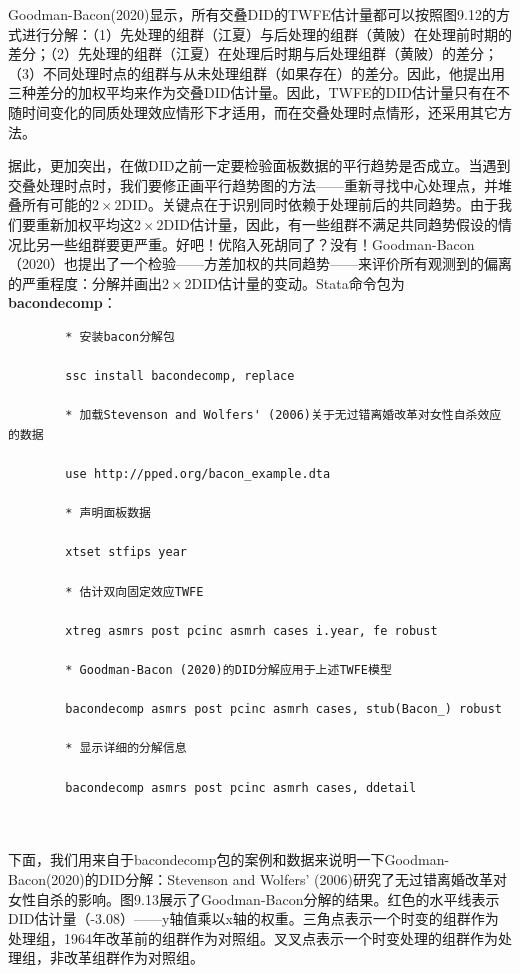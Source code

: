 \documentclass[cn,12pt,math=newtx,citestyle=gb7714-2015,bibstyle=gb7714-2015]{elegantbook}
\begin{document}
	Goodman-Bacon(2020)显示，所有交叠DID的TWFE估计量都可以按照图9.12的方式进行分解：（1）先处理的组群（江夏）与后处理的组群（黄陂）在处理前时期的差分；（2）先处理的组群（江夏）在处理后时期与后处理组群（黄陂）的差分；（3）不同处理时点的组群与从未处理组群（如果存在）的差分。因此，他提出用三种差分的加权平均来作为交叠DID估计量。因此，TWFE的DID估计量只有在不随时间变化的同质处理效应情形下才适用，而在交叠处理时点情形，还采用其它方法。
	
	据此，更加突出，在做DID之前一定要检验面板数据的平行趋势是否成立。当遇到交叠处理时点时，我们要修正画平行趋势图的方法——重新寻找中心处理点，并堆叠所有可能的$2 \times 2$DID。关键点在于识别同时依赖于处理前后的共同趋势。由于我们要重新加权平均这$2 \times 2$DID估计量，因此，有一些组群不满足共同趋势假设的情况比另一些组群要更严重。好吧！优陷入死胡同了？没有！Goodman-Bacon（2020）也提出了一个检验——方差加权的共同趋势——来评价所有观测到的偏离的严重程度：分解并画出$2 \times 2$DID估计量的变动。Stata命令包为\textbf{bacondecomp}：
	
	\begin{lstlisting}
		* 安装bacon分解包
		
		ssc install bacondecomp, replace
		
		* 加载Stevenson and Wolfers' (2006)关于无过错离婚改革对女性自杀效应的数据
		
		use http://pped.org/bacon_example.dta
		
		* 声明面板数据
		
		xtset stfips year
		
		* 估计双向固定效应TWFE
		
		xtreg asmrs post pcinc asmrh cases i.year, fe robust
		
		* Goodman-Bacon (2020)的DID分解应用于上述TWFE模型
		
		bacondecomp asmrs post pcinc asmrh cases, stub(Bacon_) robust
		
		* 显示详细的分解信息
		
		bacondecomp asmrs post pcinc asmrh cases, ddetail
		
		
	\end{lstlisting}
	
    下面，我们用来自于bacondecomp包的案例和数据来说明一下Goodman-Bacon(2020)的DID分解：Stevenson and Wolfers' (2006)研究了无过错离婚改革对女性自杀的影响。图9.13展示了Goodman-Bacon分解的结果。红色的水平线表示DID估计量（-3.08）——y轴值乘以x轴的权重。三角点表示一个时变的组群作为处理组，1964年改革前的组群作为对照组。叉叉点表示一个时变处理的组群作为处理组，非改革组群作为对照组。
	
\end{document}
